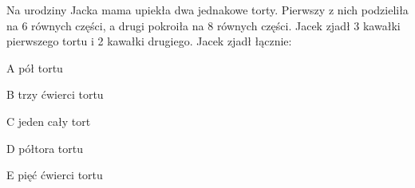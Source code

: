 \begin{tresc}
Na urodziny Jacka mama upiekła dwa jednakowe torty. Pierwszy z nich podzieliła na 6 równych części, a drugi pokroiła na 8 równych części. Jacek zjadł 3 kawałki pierwszego tortu i 2 kawałki drugiego. Jacek zjadł łącznie:
\end{tresc}
\begin{wariant}{A} pół tortu \end{wariant}
\begin{wariant}{B} trzy ćwierci tortu \end{wariant}
\begin{wariant}{C} jeden cały tort \end{wariant}
\begin{wariant}{D} półtora tortu \end{wariant}
\begin{wariant}{E} pięć ćwierci tortu \end{wariant}
